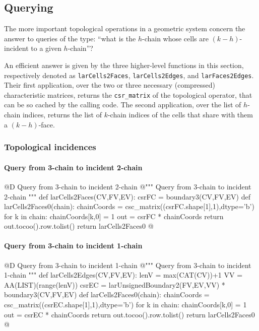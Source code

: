 \documentclass[11pt,oneside]{article}    %
\begin{document}
\subsection{Querying}

The more important topological operations in a geometric system concern the answer to queries of the type: ``what is the $h$-chain whose cells are $(k-h)$-incident to a given $h$-chain''?

An efficient answer is given by the three higher-level functions in this section, respectively denoted as \texttt{larCells2Faces}, \texttt{larCells2Edges}, and \texttt{larFaces2Edges}.
Their first application, over the two or three necessary (compressed) characteristic matrices, returns the \texttt{csr\_matrix} of the topological operator, that can be so cached by the calling code.
The second application, over the list of $h$-chain indices, returns the list of $k$-chain indices of the cells that share with them a $(k-h)$-face.


\subsubsection{Topological incidences}


\paragraph{Query from 3-chain to incident 2-chain}
@D Query from 3-chain to incident 2-chain
@{""" Query from 3-chain to incident 2-chain """
def larCells2Faces(CV,FV,EV):
    csrFC = boundary3(CV,FV,EV)
    def larCells2Faces0(chain):
        chainCoords = csc_matrix((csrFC.shape[1],1),dtype='b')
        for k in chain: chainCoords[k,0] = 1
        out = csrFC * chainCoords
        return out.tocoo().row.tolist()
    return larCells2Faces0
@}

\paragraph{Query from 3-chain to incident 1-chain}
@D Query from 3-chain to incident 1-chain
@{""" Query from 3-chain to incident 1-chain """
def larCells2Edges(CV,FV,EV):
    lenV = max(CAT(CV))+1
    VV = AA(LIST)(range(lenV))
    csrEC = larUnsignedBoundary2(FV,EV,VV) * boundary3(CV,FV,EV)
    def larCells2Faces0(chain):
        chainCoords = csc_matrix((csrEC.shape[1],1),dtype='b')
        for k in chain: chainCoords[k,0] = 1
        out = csrEC * chainCoords
        return out.tocoo().row.tolist()
    return larCells2Faces0
@}
\end{document}
